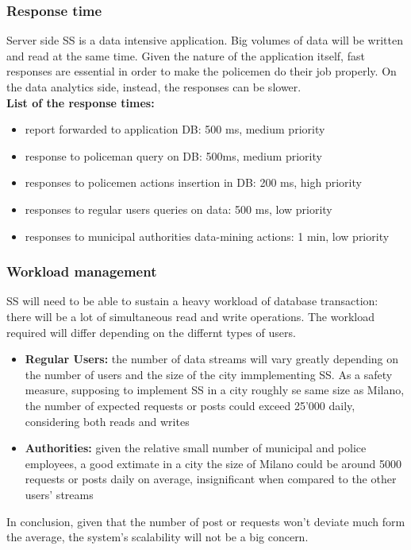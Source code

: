 	\subsubsection{Response time}
	
Server side SS is a data intensive application. Big volumes of data  will be written and read at the same time. Given the nature of the application itself, fast responses are essential in order to make the policemen do their job properly. On the data analytics side, instead, the responses can be slower.\\

\textbf{List of the response times:}
\begin{itemize}
\item report forwarded to application DB: 500 ms, medium priority
\item response to policeman query on DB: 500ms, medium priority
\item responses to policemen actions insertion in DB: 200 ms, high priority
\item responses to regular users queries on data: 500 ms, low priority
\item responses to municipal authorities data-mining actions: 1 min, low priority
\end{itemize}
\subsubsection{Workload management}
SS will need to be able to sustain a heavy workload of database transaction: there will be a lot of simultaneous read and write operations. The workload required will differ depending on the differnt types of users.
\begin{itemize}
	\item \textbf{Regular Users:} the number of data streams will vary greatly depending on the number of users and the size of the city immplementing SS. As a safety measure, supposing to implement SS in a city roughly se same size as Milano, the number of expected requests or posts could exceed 25'000 daily, considering both reads and writes
	\item \textbf{Authorities: } given the relative small number of municipal and police employees, a good extimate in a city the size of Milano could be around 5000 requests or posts daily on average, insignificant when compared to the other users' streams  
\end{itemize}
In conclusion, given that the number of post or requests won't deviate much form the average, the system's scalability will not be a big concern.



